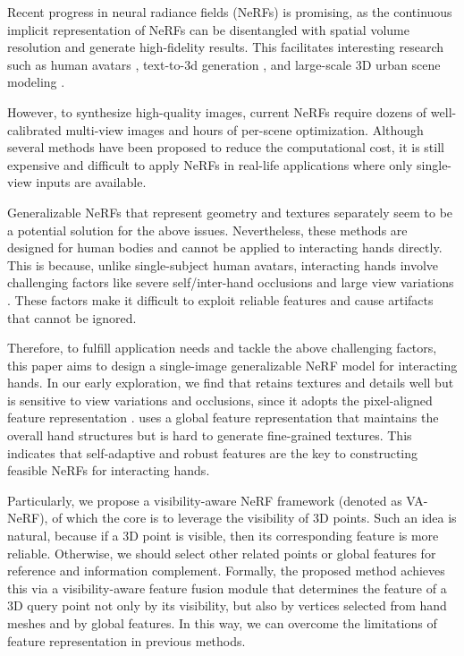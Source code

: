 \documentclass[letterpaper]{article} %
\begin{document}
Recent progress in neural radiance fields (NeRFs) \cite{mildenhall2021nerf,gao2022nerf,niemeyer2022regnerf, Johari_2022_CVPR} is promising, as the continuous implicit representation of NeRFs can be disentangled with spatial volume resolution and generate high-fidelity results. This facilitates interesting research such as human avatars \cite{jiang2022instantavatar}, text-to-3d generation \cite{poole2022dreamfusion}, and large-scale 3D urban scene modeling \cite{turki2022mega}.

However, to synthesize high-quality images, current NeRFs require dozens of well-calibrated multi-view images and hours of per-scene optimization. Although several methods \cite{muller2022instant,chen2022tensorf} have been proposed to reduce the computational cost, it is still expensive and difficult to apply NeRFs in real-life applications where only single-view inputs are available.

Generalizable NeRFs \cite{mihajlovic2022keypointnerf,kwon2021neural} that represent geometry and textures separately seem to be a potential solution for the above issues. Nevertheless, these methods are designed for human bodies and cannot be applied to interacting hands directly. This is because, unlike single-subject human avatars, interacting hands involve challenging factors like severe self/inter-hand occlusions and large view variations \cite{park2022handoccnet,deng2022recurrent}. These factors make it difficult to exploit reliable features and cause artifacts that cannot be ignored.

Therefore, to fulfill application needs and tackle the above challenging factors, this paper aims to design a single-image generalizable NeRF model for interacting hands. In our early exploration, we find that \cite{mihajlovic2022keypointnerf} retains textures and details well but is sensitive to view variations and occlusions, since it adopts the pixel-aligned feature representation \cite{saito2019pifu}. \cite{kwon2021neural} uses a global feature representation that maintains the overall hand structures but is hard to generate fine-grained textures. This indicates that self-adaptive and robust features are the key to constructing feasible NeRFs for interacting hands.

Particularly, we propose a visibility-aware NeRF framework (denoted as VA-NeRF), of which the core is to leverage the visibility of 3D points. Such an idea is natural, because if a 3D point is visible, then its corresponding feature is more reliable. Otherwise, we should select other related points or global features for reference and information complement. Formally, the proposed method achieves this via a visibility-aware feature fusion module that determines the feature of a 3D query point not only by its visibility, but also by vertices selected from hand meshes and by global features. In this way, we can overcome the limitations of feature representation in previous methods.
\end{document}
